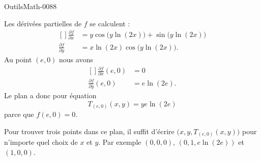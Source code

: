 
\begin{corrige}{OutilsMath-0088}

    Les dérivées partielles de $f$ se calculent :
    \begin{equation}
        \begin{aligned}[]
            \frac{ \partial f }{ \partial x }&=y\cos\big( y\ln(2x) \big)+\sin\big( y\ln(2x) \big)\\
            \frac{ \partial f }{ \partial y }&=x \ln(2x)\cos\big( y\ln(2x) \big).
        \end{aligned}
    \end{equation}
    Au point $(e,0)$ nous avons
    \begin{equation}
        \begin{aligned}[]
            \frac{ \partial f }{ \partial x }(e,0)&=0\\
            \frac{ \partial f }{ \partial y }(e,0)&=e\ln(2e).
        \end{aligned}
    \end{equation}
    Le plan a donc pour équation
    \begin{equation}
        T_{(e,0)}(x,y)=ye\ln(2e)
    \end{equation}
    parce que $f(e,0)=0$.

    Pour trouver trois points dans ce plan, il suffit d'écrire $\big( x,y,T_{(e,0)}(x,y)\big)$ pour n'importe quel choix de $x$ et $y$. Par exemple $(0,0,0)$, $(0,1,e\ln(2e))$ et $(1,0,0)$.

\end{corrige}
